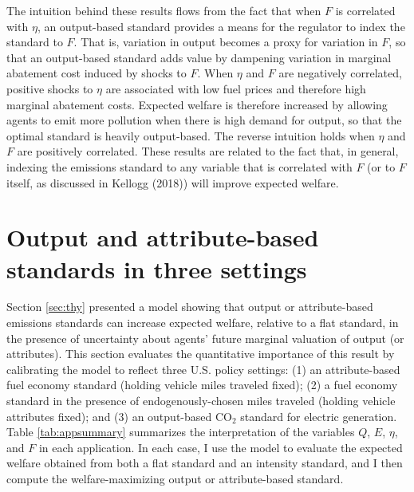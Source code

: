\documentclass[12pt]{article}
\begin{document}
The intuition behind these results flows from the fact that when $F$ is correlated with $\eta$, an output-based standard provides a means for the regulator to index the standard to $F$. That is, variation in output becomes a proxy for variation in $F$, so that an output-based standard adds value by dampening variation in marginal abatement cost induced by shocks to $F$. When $\eta$ and $F$ are negatively correlated, positive shocks to $\eta$ are associated with low fuel prices and therefore high marginal abatement costs. Expected welfare is therefore increased by allowing agents to emit more pollution when there is high demand for output, so that the optimal standard is heavily output-based. The reverse intuition holds when $\eta$ and $F$ are positively correlated. These results are related to the fact that, in general, indexing the emissions standard to any variable that is correlated with $F$ (or to $F$ itself, as discussed in Kellogg (2018)) will improve expected welfare.



\section{Output and attribute-based standards in three settings} \label{sec:apps}

Section \ref{sec:thy} presented a model showing that output or attribute-based emissions standards can increase expected welfare, relative to a flat standard, in the presence of uncertainty about agents' future marginal valuation of output (or attributes). This section evaluates the quantitative importance of this result by calibrating the model to reflect three U.S. policy settings: (1) an attribute-based fuel economy standard (holding vehicle miles traveled fixed); (2) a fuel economy standard in the presence of endogenously-chosen miles traveled (holding vehicle attributes fixed); and (3) an output-based CO$_{\text{2}}$ standard for electric generation. Table \ref{tab:appsummary} summarizes the interpretation of the variables $Q$, $E$, $\eta$, and $F$ in each application. In each case, I use the model to evaluate the expected welfare obtained from both a flat standard and an intensity standard, and I then compute the welfare-maximizing output or attribute-based standard.
\end{document}

